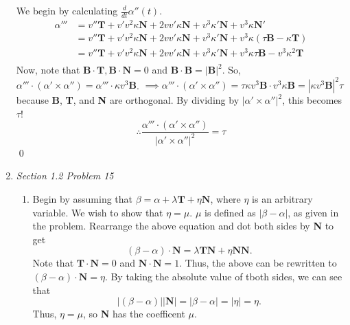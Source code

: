 \documentclass{article}
\begin{document}
\begin{enumerate}
We begin by calculating $\frac{d}{dt}\alpha''(t)$.
\begin{align*}
\alpha''' &= v''\mathbf{T} + v'v^2\kappa \mathbf{N} + 2vv'\kappa \mathbf{N} + v^3\kappa' \mathbf{N} + v^3\kappa \mathbf{N}'\\ 
&= v''\mathbf{T} + v'v^2\kappa \mathbf{N} + 2vv'\kappa \mathbf{N} + v^3\kappa' \mathbf{N} + v^3\kappa (\tau \mathbf{B} - \kappa \mathbf{T})\\
&= v''\mathbf{T} + v'v^2\kappa \mathbf{N} + 2vv'\kappa \mathbf{N} + v^3\kappa' \mathbf{N} + v^3\kappa\tau \mathbf{B} - v^3\kappa^2 \mathbf{T}\\
\end{align*}
Now, note that $\mathbf{B} \cdot \mathbf{T}, \mathbf{B} \cdot \mathbf{N} = 0$ and $ \mathbf{B} \cdot \mathbf{B} = |\mathbf{B}|^2$.
So, $\alpha''' \cdot (\alpha' \times \alpha'') = \alpha''' \cdot \kappa v^3 \mathbf{B}$.
\newline
$\implies \alpha''' \cdot (\alpha' \times \alpha'') = \tau\kappa v^3 \mathbf{B} \cdot v^3\kappa \mathbf{B} 
= |\kappa v^3 \mathbf{B}|^2\tau$ because \textbf{B}, \textbf{T}, and \textbf{N} are orthogonal. 
By dividing by $|\alpha' \times \alpha''|^2$, this becomes $\tau$!
\begin{equation*}
\therefore \frac{\alpha''' \cdot (\alpha' \times \alpha'')}{|\alpha' \times \alpha''|^2} = \tau
\end{equation*}
\qed

\item \textit{Section 1.2 Problem 15}\\ %

\begin{enumerate}

\item 

Begin by assuming that $\beta = \alpha + \lambda\mathbf{T} + \eta\mathbf{N}$, where $\eta$ is an arbitrary variable.
We wish to show that $\eta = \mu$.
$\mu$ is defined as $|\beta - \alpha|$, as given in the problem.
Rearrange the above equation and dot both sides by \textbf{N} to get
\begin{equation*}
(\beta-\alpha)\cdot\mathbf{N} = \lambda\mathbf{T}\mathbf{N} + \eta\mathbf{N}\mathbf{N}.
\end{equation*}
Note that $\mathbf{T}\cdot\mathbf{N} = 0$ and $\mathbf{N}\cdot\mathbf{N} = 1$.
Thus, the above can be rewritten to $(\beta-\alpha)\cdot\mathbf{N} = \eta$. 
By taking the absolute value of tboth sides, we can see that 
\begin{equation*}
|(\beta-\alpha)||\mathbf{N}| = |\beta - \alpha| = |\eta| = \eta.
\end{equation*}
Thus, $\eta = \mu$, so \textbf{N} has the coefficent $\mu$.


\end{enumerate}
\end{enumerate}
\end{document}
